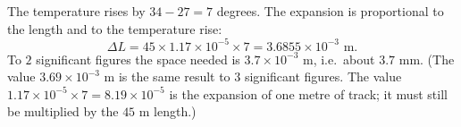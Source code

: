 The temperature rises by $34-27=7$ degrees. The expansion is proportional to the length and to the temperature rise:
\[
\Delta L=45\times1.17\times10^{-5}\times7=3.6855\times10^{-3}\text{ m}.
\]
To $2$ significant figures the space needed is $\boxed{3.7\times10^{-3}\text{ m}}$, i.e.\ about $3.7$ mm. (The value $3.69\times10^{-3}$ m is the same result to $3$ significant figures. The value $1.17\times10^{-5}\times7=8.19\times10^{-5}$ is the expansion of one metre of track; it must still be multiplied by the $45$ m length.)
